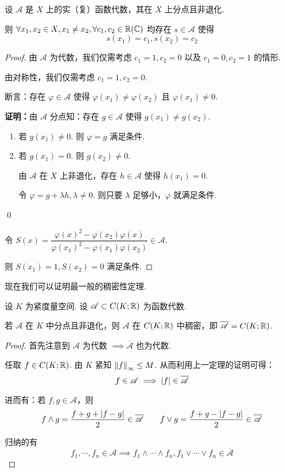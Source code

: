 \begin{lemma}
    设 $\mathscr{A}$ 是 $X$ 上的实（复）函数代数，其在 $X$ 上分点且非退化.

    则 $\forall x_1,x_2\in X,x_1\ne x_2,\forall c_1,c_2\in\mathbb{R}(\mathbb{C})$ 均存在 $s\in\mathscr{A}$ 使得
$$
s(x_1)=c_1,s(x_2)=c_2
$$
\end{lemma}
\begin{proof}
    由 $\mathscr{A}$ 为代数，我们仅需考虑 $c_1=1,c_2=0$ 以及 $c_1=0,c_2=1$ 的情形.

    由对称性，我们仅需考虑 $c_1=1,c_2=0$.

    断言：存在 $\varphi\in\mathscr{A}$ 使得 $\varphi(x_1)\ne\varphi(x_2)$ 且 $\varphi(x_1)\ne 0$.

    \textbf{证明：}由 $\mathscr{A}$ 分点知：存在 $g\in\mathscr{A}$ 使得 $g(x_1)\ne g(x_2)$.

    \begin{enumerate}
        \item 若 $g(x_1)\ne 0$. 则 $\varphi=g$ 满足条件.
        
        \item 若 $g(x_1)=0$. 则 $g(x_2)\ne 0$.
        
        由 $\mathscr{A}$ 在 $X$ 上非退化，存在 $h\in\mathscr{A}$ 使得 $h(x_1)=0$.

        令 $\varphi=g+\lambda h,\lambda\ne 0$. 则只要 $\lambda$ 足够小，$\varphi$ 就满足条件.
    \end{enumerate}

    \qed

    令 $S(x)=\dfrac{\varphi(x)^2-\varphi(x_2)\varphi(x)}{\varphi(x_1)^2-\varphi(x_1)\varphi(x_2)}\in\mathscr{A}$.

    则 $S(x_1)=1,S(x_2)=0$ 满足条件.
\end{proof}

现在我们可以证明最一般的稠密性定理.

\begin{theorem}[Stone]
    设 $K$ 为紧度量空间. 设 $\mathscr{A}\subset C(K;\mathbb{R})$ 为函数代数.

    若 $\mathscr{A}$ 在 $K$ 中分点且非退化，则 $\mathscr{A}$ 在 $C(K;\mathbb{R})$ 中稠密，即 $\overline{\mathscr{A}}=C(K;\mathbb{R})$.
\end{theorem}
\begin{proof}
    首先注意到 $\mathscr{A}$ 为代数 $\implies\overline{\mathscr{A}}$ 也为代数.

    任取 $f\in C(K;\mathbb{R})$. 由 $K$ 紧知 $\left\lVert{f}\right\rVert_\infty\le M$. 从而利用上一定理的证明可得：
$$
f\in\mathscr{A}\implies\left\lvert{f}\right\rvert\in\overline{\mathscr{A}}
$$

    进而有：若 $f,g\in\mathscr{A}$，则
$$
f\wedge g=\frac{f+g+\left\lvert{f-g}\right\rvert}{2}\in\overline{\mathscr{A}}\qquad f\vee g=\frac{f+g-\left\lvert{f-g}\right\rvert}{2}\in\overline{\mathscr{A}}
$$

    归纳的有
$$
f_1,\cdots,f_n\in\mathscr{A}\implies f_1\wedge\cdots\wedge f_n,f_1\vee\cdots\vee f_n\in\overline{\mathscr{A}}
$$
\end{proof}